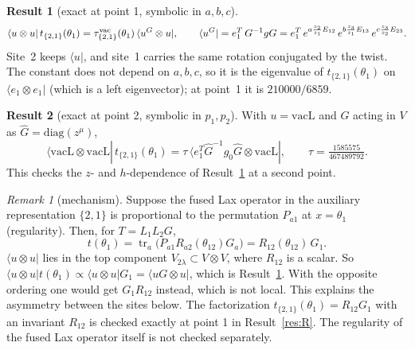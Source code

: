 \documentclass[11pt]{article}
\theoremstyle{definition}
\newtheorem{result}{Result}
\theoremstyle{remark}
\newtheorem*{remark}{Remark}
\begin{document}
\begin{result}[exact at point 1, symbolic in $a,b,c$]\label{res:main}
\begin{equation}
\langle u\otimes u|\,t_{\{2,1\}}(\theta_1)=\tau^{\rm vac}_{\{2,1\}}(\theta_1)\,\langle u^G\otimes u|,\qquad
\langle u^G|=e_1^T\,G^{-1}gG=e_1^T\,e^{a\frac{z_2}{z_1}E_{12}}\,e^{b\frac{z_3}{z_1}E_{13}}\,e^{c\frac{z_3}{z_2}E_{23}}.
\end{equation}
Site~2 keeps $\langle u|$, and site~1 carries the same rotation conjugated by the twist. The constant does not depend on $a,b,c$, so it is the eigenvalue of $t_{\{2,1\}}(\theta_1)$ on $\langle e_1\otimes e_1|$ (which is a left eigenvector); at point~1 it is $210000/6859$.
\end{result}

\begin{result}[exact at point 2, symbolic in $p_1,p_2$]\label{res:pt2}
With $u=\mathrm{vacL}$ and $G$ acting in $V$ as $\hat G=\mathrm{diag}(z^\mu)$,
\begin{equation}
\langle \mathrm{vacL}\otimes\mathrm{vacL}|\,t_{\{2,1\}}(\theta_1)=\tau\,\langle e_1^T\hat G^{-1}g_0\hat G\otimes\mathrm{vacL}|,\qquad \tau=\tfrac{1585575}{467489792}.
\end{equation}
This checks the $z$- and $h$-dependence of Result~\ref{res:main} at a second point.
\end{result}

\begin{remark}[mechanism]
Suppose the fused Lax operator in the auxiliary representation $\{2,1\}$ is proportional to the permutation $P_{a1}$ at $x=\theta_1$ (regularity). Then, for $T=L_1L_2G$,
\begin{equation}
t(\theta_1)=\operatorname{tr}_a\!\big(P_{a1}R_{a2}(\theta_{12})G_a\big)=R_{12}(\theta_{12})\,G_1 .
\end{equation}
$\langle u\otimes u|$ lies in the top component $V_{2\lambda}\subset V\otimes V$, where $R_{12}$ is a scalar. So $\langle u\otimes u|t(\theta_1)\propto\langle u\otimes u|G_1=\langle uG\otimes u|$, which is Result~\ref{res:main}. With the opposite ordering one would get $G_1R_{12}$ instead, which is not local. This explains the asymmetry between the sites below. The factorization $t_{\{2,1\}}(\theta_1)=R_{12}G_1$ with an invariant $R_{12}$ is checked exactly at point 1 in Result~\ref{res:R}. The regularity of the fused Lax operator itself is not checked separately.
\end{remark}
\end{document}
